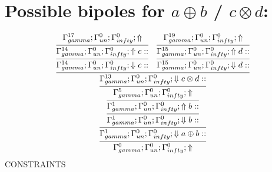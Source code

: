 \documentclass[a4paper, 11pt]{article}
\begin{document}
\section{Possible bipoles for $a \oplus b$ / $c \otimes d$:} 

{\small
\[
\infer{\Gamma_{ gamma}^{0} ; \Gamma_{un}^{0} ; \Gamma_{ infty}^{0} ;  \Uparrow }
{\infer{\Gamma_{ gamma}^{1} ; \Gamma_{un}^{0} ; \Gamma_{ infty}^{0} ;  \Downarrow a \oplus b :: }
{\infer{\Gamma_{ gamma}^{1} ; \Gamma_{un}^{0} ; \Gamma_{ infty}^{0} ;  \Downarrow b :: }
{\infer{\Gamma_{ gamma}^{1} ; \Gamma_{un}^{0} ; \Gamma_{ infty}^{0} ;  \Uparrow b :: }
{\infer{\Gamma_{ gamma}^{5} ; \Gamma_{un}^{0} ; \Gamma_{ infty}^{0} ;  \Uparrow }
{\infer{\Gamma_{ gamma}^{13} ; \Gamma_{un}^{0} ; \Gamma_{ infty}^{0} ;  \Downarrow c \otimes d :: }
{\infer{\Gamma_{ gamma}^{14} ; \Gamma_{un}^{0} ; \Gamma_{ infty}^{0} ;  \Downarrow c :: }
{\infer{\Gamma_{ gamma}^{14} ; \Gamma_{un}^{0} ; \Gamma_{ infty}^{0} ;  \Uparrow c :: }
{\Gamma_{ gamma}^{17} ; \Gamma_{un}^{0} ; \Gamma_{ infty}^{0} ;  \Uparrow }}
&
\infer{\Gamma_{ gamma}^{15} ; \Gamma_{un}^{0} ; \Gamma_{ infty}^{0} ;  \Downarrow d :: }
{\infer{\Gamma_{ gamma}^{15} ; \Gamma_{un}^{0} ; \Gamma_{ infty}^{0} ;  \Uparrow d :: }
{\Gamma_{ gamma}^{19} ; \Gamma_{un}^{0} ; \Gamma_{ infty}^{0} ;  \Uparrow }}}}}}}}
\]
}
CONSTRAINTS
\end{document}

